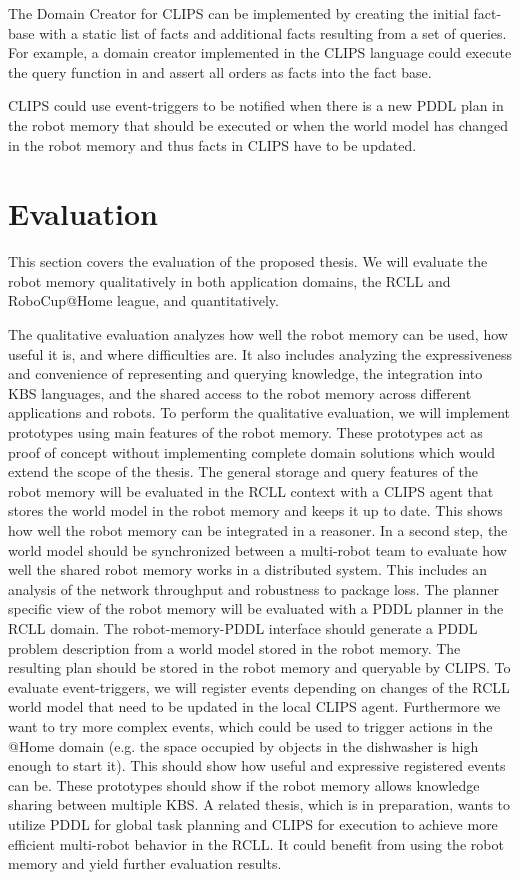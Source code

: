 The Domain Creator for CLIPS can be implemented by creating the initial
fact-base with a static list of facts and additional facts resulting
from a set of queries. For example, a domain creator implemented in
the CLIPS language could execute the query function in
 and assert all orders as facts into the fact
base.

CLIPS could use event-triggers to be notified when there is a new PDDL
plan in the robot memory that should be executed or when the world
model has changed in the robot memory and thus facts in CLIPS have to
be updated.

\chapter{Evaluation}
\label{sec:eval}
This section covers the evaluation of the proposed thesis. We will
evaluate the robot memory qualitatively in both application domains,
the RCLL and RoboCup@Home league, and quantitatively.

The qualitative evaluation analyzes how well the robot memory can be
used, how useful it is, and where difficulties are. It also includes
analyzing the expressiveness and convenience of representing and
querying knowledge, the integration into KBS
languages, and the shared access to the robot memory across different
applications and robots. To perform the qualitative evaluation, we
will implement prototypes using main features of the robot
memory. These prototypes act as proof of concept without implementing
complete domain solutions which would extend the scope of the thesis.
%
The general storage and query features of the robot memory will be
evaluated in the RCLL context with a CLIPS agent that stores the world
model in the robot memory and keeps it up to date. This shows how well
the robot memory can be integrated in a reasoner.
%
In a second step, the world model should be synchronized between a
multi-robot team to evaluate how well the shared robot memory works in
a distributed system. This includes an analysis of the network
throughput and robustness to package loss.
%
The planner specific view of the robot memory will be evaluated with a
PDDL planner in the RCLL domain. The robot-memory-PDDL interface
should generate a PDDL problem description from a world model stored
in the robot memory. The resulting plan should be stored in the robot
memory and queryable by CLIPS.
%
To evaluate event-triggers, we will register events depending on
changes of the RCLL world model that need to be updated in the local
CLIPS agent. Furthermore we want to try more complex events, which
could be used to trigger actions in the @Home domain (e.g. the space
occupied by objects in the dishwasher is high enough to start it).
This should show how useful and expressive registered events can be.
% 
These prototypes should show if the robot memory allows knowledge
sharing between multiple KBS. A related thesis,
which is in preparation, wants to utilize PDDL for global task
planning and CLIPS for execution to achieve more efficient multi-robot
behavior in the RCLL. It could benefit from using the robot memory and
yield further evaluation results.

